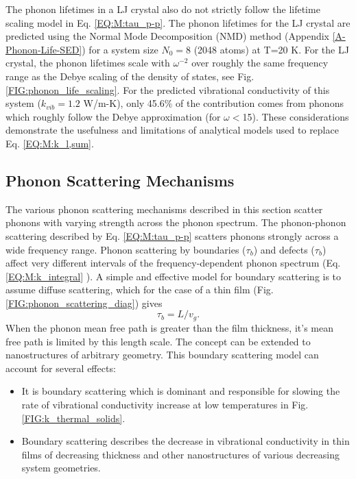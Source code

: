 \documentclass[letterpaper,12pt]{article}
\begin{document}
The phonon lifetimes in a LJ crystal also do not strictly follow the lifetime scaling model in Eq$.$ \eqref{EQ:M:tau_p-p}. The phonon lifetimes for the LJ crystal are predicted using the Normal Mode Decomposition (NMD) method (Appendix \ref{A-Phonon-Life-SED}) for a system size $N_0=8$ (2048 atoms) at T=20 K. For the LJ crystal, the phonon lifetimes scale with $\omega^{-2}$ over roughly the same frequency range as the Debye scaling of the density of states, see Fig. \eqref{FIG:phonon_life_scaling}. For the predicted vibrational conductivity of this system ($k_{vib} = 1.2$ W/m-K), only 45.6$\%$ of the contribution comes from phonons which roughly follow the Debye approximation (for $\omega<$15). These considerations demonstrate the usefulness and limitations of analytical models used to replace Eq$.$ \eqref{EQ:M:k_l,sum}.
\subsection{\label{S-Prelim-Phonon-Scattering}Phonon Scattering Mechanisms}
The various phonon scattering mechanisms described in this section scatter phonons with varying strength across the phonon spectrum. The phonon-phonon scattering described by Eq$.$ \eqref{EQ:M:tau_p-p} scatters phonons strongly across a wide frequency range. Phonon scattering by boundaries ($\tau_{b}$) and defects ($\tau_{b}$) affect very different intervals of the frequency-dependent phonon spectrum (Eq$.$ \eqref{EQ:M:k_integral} ).
A simple and effective model for boundary scattering is to assume diffuse scattering, which for the case of a thin film (Fig. \ref{FIG:phonon_scattering_diag}) gives
\begin{equation}\label{EQ:M:tau_b}
\tau_{b} = L/v_g.
\end{equation}
When the phonon mean free path is greater than the film thickness, it's mean free path is limited by this length scale. The concept can be extended to nanostructures of arbitrary geometry.\cite{mcgaughey:061911} This boundary scattering model can account for several effects:
\begin{itemize}
\item It is boundary scattering which is dominant and responsible for slowing the rate of vibrational conductivity increase at low temperatures in Fig$.$ \ref{FIG:k_thermal_solids}.
\item Boundary scattering describes the decrease in vibrational conductivity in thin films of decreasing thickness and other nanostructures of various decreasing system geometries.\cite{mcgaughey:061911}
\end{itemize}
\end{document}
